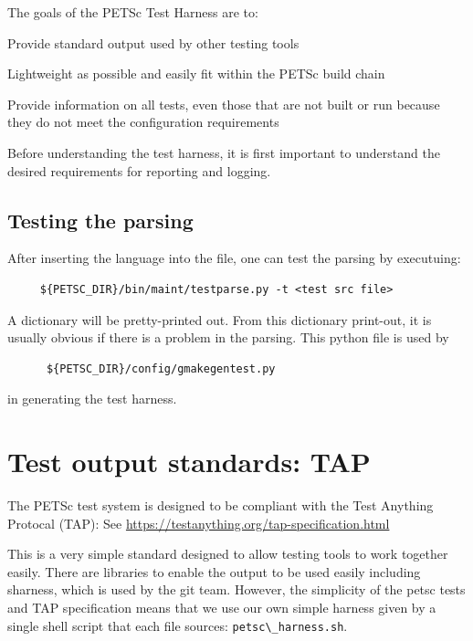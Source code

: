 The goals of the PETSc Test Harness are to:
%
\begin{tightitemize}
\item Provide standard output used by other testing tools

\item Lightweight as possible and easily fit within the PETSc build chain

\item Provide information on all tests, even those that are not built or
run because they do not meet the configuration requirements
\end{tightitemize}

Before understanding the test harness, it is first important to
understand the desired requirements for reporting and logging.


\subsection{Testing the parsing%
  \label{testing-the-parsing}%
}

After inserting the language into the file, one can test the parsing
by executuing:
%
\begin{verbatim}
     ${PETSC_DIR}/bin/maint/testparse.py -t <test src file>
\end{verbatim}

A dictionary will be pretty-printed out.  From this dictionary
print-out, it is usually obvious if there is a problem in the parsing.
This python file is used by 
\begin{verbatim}
      ${PETSC_DIR}/config/gmakegentest.py
\end{verbatim}
in generating the test harness.


\section{Test output standards: TAP}%
  \label{test-output-standards-tap}%

The PETSc test system is designed to be compliant with the Test Anything
Protocal (TAP): See \url{https://testanything.org/tap-specification.html}

This is a very simple standard designed to allow testing tools to work
together easily.  There are libraries to enable the output to be used
easily including sharness, which is used by the git team.  However, the
simplicity of the petsc tests and TAP specification means that we use
our own simple harness given by a single shell script that each file
sources: \lstinline{petsc\_harness.sh}.

